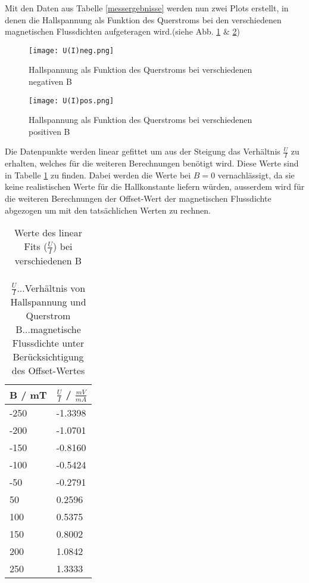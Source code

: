 \documentclass[12pt, a4paper]{article}
\begin{document}
Mit den Daten aus Tabelle \ref{messergebnisse} werden nun zwei Plots erstellt, in denen die Hallspannung als Funktion des Querstroms bei den verschiedenen magnetischen Flussdichten aufgeteragen wird.(siehe Abb. \ref{U/Ineg} $\&$ \ref{U/Ipos})\\

\begin{figure}[!htpb]
    \centering
    \texttt{[image: U(I)neg.png]}
    \caption{Hallspannung als Funktion des Querstroms bei verschiedenen negativen B}
    \label{U/Ineg}
\end{figure}

 
\begin{figure}[!htpb]
    \centering
    \texttt{[image: U(I)pos.png]}
    \caption{Hallspannung als Funktion des Querstroms bei verschiedenen positiven B}
    \label{U/Ipos}
\end{figure}


Die Datenpunkte werden linear gefittet um aus der Steigung das Verhältnis $\frac{U}{I}$ zu erhalten, welches für die weiteren Berechnungen benötigt wird. Diese Werte sind in Tabelle \ref{u/Ifit} zu finden. Dabei werden die Werte bei $B = 0$ vernachlässigt, da sie keine realistischen Werte für die Hallkonstante liefern würden, ausserdem wird für die weiteren Berechnungen der Offset-Wert der magnetischen Flussdichte abgezogen um mit den tatsächlichen Werten zu rechnen.

\begin{table}[!htbp]
\caption{Werte des linear Fits ($\frac{U}{I}$) bei verschiedenen B\\\\
$\frac{U}{I}$...Verhältnis von Hallspannung und Querstrom\\
B...magnetische Flussdichte unter Berücksichtigung des Offset-Wertes\\}
\label{u/Ifit}
\begin{tabular}{|l|l|}
\hline
B / mT & $\frac{U}{I}$ / $\frac{mV}{mA}$              \\ \hline
-250 & -1.3398 \\\hline
-200 & -1.0701 \\\hline
-150 & -0.8160 \\\hline
-100 & -0.5424 \\\hline
-50 & -0.2791 \\\hline
50 & 0.2596 \\\hline
100 & 0.5375 \\\hline
150 & 0.8002 \\\hline
200 & 1.0842 \\\hline
250 & 1.3333 \\\hline
\end{tabular}
\end{table}
\end{document}
